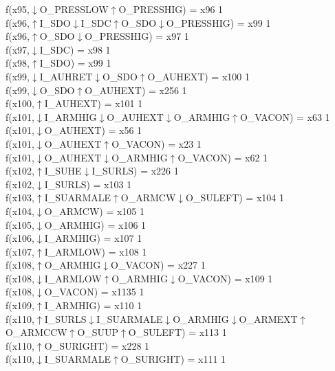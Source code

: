 f(x95,$\downarrow$O\_PRESSLOW$\uparrow$O\_PRESSHIG) = x96 {1} \\
f(x96,$\uparrow$I\_SDO$\downarrow$I\_SDC$\uparrow$O\_SDO$\downarrow$O\_PRESSHIG) = x99 {1} \\
f(x96,$\uparrow$O\_SDO$\downarrow$O\_PRESSHIG) = x97 {1} \\
f(x97,$\downarrow$I\_SDC) = x98 {1} \\
f(x98,$\uparrow$I\_SDO) = x99 {1} \\
f(x99,$\downarrow$I\_AUHRET$\downarrow$O\_SDO$\uparrow$O\_AUHEXT) = x100 {1} \\
f(x99,$\downarrow$O\_SDO$\uparrow$O\_AUHEXT) = x256 {1} \\
f(x100,$\uparrow$I\_AUHEXT) = x101 {1} \\
f(x101,$\downarrow$I\_ARMHIG$\downarrow$O\_AUHEXT$\downarrow$O\_ARMHIG$\uparrow$O\_VACON) = x63 {1} \\
f(x101,$\downarrow$O\_AUHEXT) = x56 {1} \\
f(x101,$\downarrow$O\_AUHEXT$\uparrow$O\_VACON) = x23 {1} \\
f(x101,$\downarrow$O\_AUHEXT$\downarrow$O\_ARMHIG$\uparrow$O\_VACON) = x62 {1} \\
f(x102,$\uparrow$I\_SUHE$\downarrow$I\_SURLS) = x226 {1} \\
f(x102,$\downarrow$I\_SURLS) = x103 {1} \\
f(x103,$\uparrow$I\_SUARMALE$\uparrow$O\_ARMCW$\downarrow$O\_SULEFT) = x104 {1} \\
f(x104,$\downarrow$O\_ARMCW) = x105 {1} \\
f(x105,$\downarrow$O\_ARMHIG) = x106 {1} \\
f(x106,$\downarrow$I\_ARMHIG) = x107 {1} \\
f(x107,$\uparrow$I\_ARMLOW) = x108 {1} \\
f(x108,$\uparrow$O\_ARMHIG$\downarrow$O\_VACON) = x227 {1} \\
f(x108,$\downarrow$I\_ARMLOW$\uparrow$O\_ARMHIG$\downarrow$O\_VACON) = x109 {1} \\
f(x108,$\downarrow$O\_VACON) = x1135 {1} \\
f(x109,$\uparrow$I\_ARMHIG) = x110 {1} \\
f(x110,$\uparrow$I\_SURLS$\downarrow$I\_SUARMALE$\downarrow$O\_ARMHIG$\downarrow$O\_ARMEXT$\uparrow$O\_ARMCCW$\uparrow$O\_SUUP$\uparrow$O\_SULEFT) = x113 {1} \\
f(x110,$\uparrow$O\_SURIGHT) = x228 {1} \\
f(x110,$\downarrow$I\_SUARMALE$\uparrow$O\_SURIGHT) = x111 {1} \\
